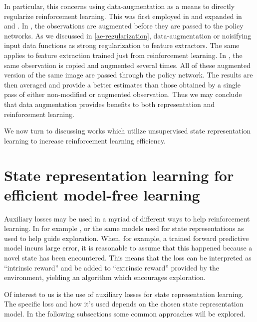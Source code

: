 In particular, this concerns using data-augmentation as a means to directly regularize 
reinforcement learning.
This was first employed in \cite{rad} and expanded in \cite{drqv1}
and \cite{drqv2}.
In \cite{rad}, the observations are augmented before they are passed
to the policy networks. As we discussed in \ref{ae-regularization},
data-augmentation or noisifying input data functions as strong regularization
to feature extractors.
The same applies to feature extraction trained just from reinforcement learning.
In \cite{drqv1}, the same observation is copied and augmented several times.
All of these augmented version of the same image are passed through the policy network.
The results are then averaged and provide a better estimates than 
those obtained by a single pass of either non-modified or augmented observation.
Thus we may conclude that data augmentation provides benefits to both 
representation and reinforcement learning.

We now turn to discussing works which utilize unsupervised state representation learning
to increase reinforcement learning efficiency.

\section{State representation learning for efficient model-free learning}
Auxiliary losses may be used in a myriad of different ways to help reinforcement learning.
In for example \cite{lossisitsownreward}, \cite{rlwauxloss} or \cite{icm}
the same models used for state representations as used to help guide exploration.
When, for example, a trained forward predictive model incurs large error,
it is reasonable to assume that this happened because a novel state has been encountered.
This means that the loss can be interpreted as ``intrinsic reward'' and be added to 
``extrinsic reward'' provided by the environment, yielding an algorithm which 
encourages exploration.

Of interest to us is the use of auxiliary losses for state representation learning.
The specific loss and how it's used depends on the chosen state representation model.
In the following subsections some common approaches will be explored.

